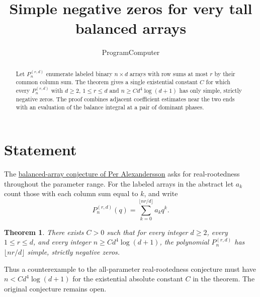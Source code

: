 \documentclass[11pt]{article}
\title{Simple negative zeros for very tall balanced arrays}
\author{ProgramComputer}
\date{}
\newtheorem{theorem}{Theorem}
\begin{document}
\maketitle

\begin{abstract}
Let $P_n^{(r,d)}$ enumerate labeled binary $n\times d$ arrays with row sums
at most $r$ by their common column sum. The theorem gives a single existential
constant $C$ for which every $P_n^{(r,d)}$ with $d\ge2$, $1\le r\le d$
and $n\ge Cd^4\log(d+1)$ has only simple, strictly negative zeros.
The proof combines adjacent coefficient estimates near the two ends
with an evaluation of the balance integral at a pair of dominant phases.
\end{abstract}

\section{Statement}
The \href{https://www.symmetricfunctions.com/realRootedOpenProblems.htm\#conjBalancedArrays}{balanced-array conjecture of Per Alexandersson}
asks for real-rootedness throughout the parameter range.
For the labeled arrays in the abstract let $a_k$ count those with
each column sum equal to $k$, and write
\[
P_n^{(r,d)}(q)=\sum_{k=0}^{\lfloor nr/d\rfloor}a_kq^k.
\]
\begin{theorem}
There exists $C>0$ such that for every integer $d\ge2$, every $1\le r\le d$,
and every integer $n\ge Cd^4\log(d+1)$, the polynomial $P_n^{(r,d)}$
has $\lfloor nr/d\rfloor$ simple, strictly negative zeros.
\end{theorem}

Thus a counterexample to the all-parameter real-rootedness conjecture must have $n<Cd^4\log(d+1)$ for the existential absolute constant $C$ in the theorem. The original conjecture remains open.



\appendix
\clearpage




\end{document}
